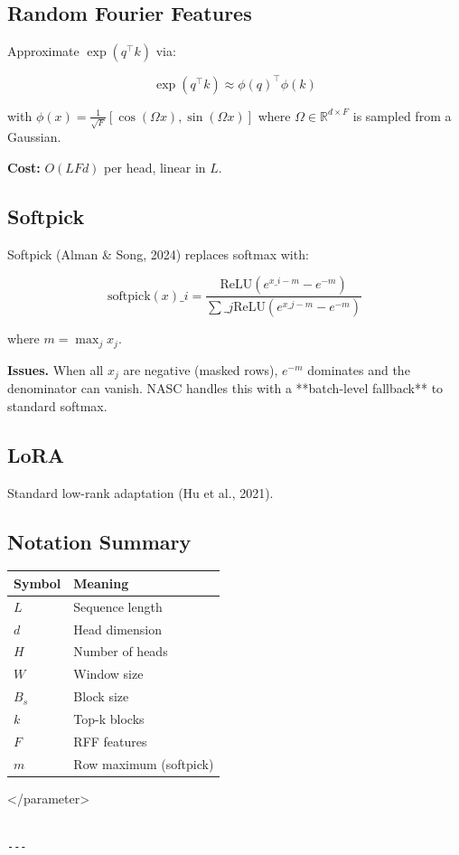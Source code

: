 \subsection{Random Fourier Features}

Approximate $\exp(q^\top k)$ via:

\[
\exp(q^\top k) \approx \phi(q)^\top \phi(k)
\tag{3.5}
\]

with $\phi(x) = \frac{1}{\sqrt{F}} [\cos(\Omega x), \sin(\Omega x)]$ where 
$\Omega \in \mathbb{R}^{d \times F}$ is sampled from a Gaussian.

\textbf{Cost:} $O(L F d)$ per head, linear in $L$.

\subsection{Softpick}

Softpick (Alman \& Song, 2024) replaces softmax with:

\[
\text{softpick}(x)\_i = \frac{\text{ReLU}(e^{x\_i - m} - e^{-m})}{\sum\_j \text{ReLU}(e^{x\_j - m} - e^{-m})}
\tag{3.6}
\]

where $m = \max_j x_j$.

\textbf{Issues.} When all $x_j$ are negative (masked rows), $e^{-m}$ dominates 
and the denominator can vanish. NASC handles this with a **batch-level 
fallback** to standard softmax.

\subsection{LoRA}

Standard low-rank adaptation (Hu et al., 2021).

\subsection{Notation Summary}

\begin{table}[H]
\centering
\small
\begin{tabular}{ll}
\toprule
\textbf{Symbol} & \textbf{Meaning} \\
\midrule
$L$ & Sequence length \\
$d$ & Head dimension \\
$H$ & Number of heads \\
$W$ & Window size \\
$B_s$ & Block size \\
$k$ & Top-k blocks \\
$F$ & RFF features \\
$m$ & Row maximum (softpick) \\
\bottomrule
\end{tabular}
\end{table}
\textless{}/parameter\textgreater{}
\begin{lstlisting}

---
\end{lstlisting}

